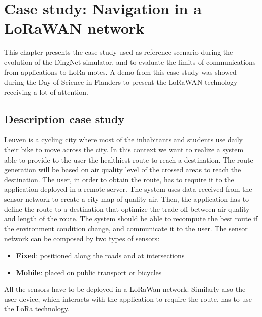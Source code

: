\chapter{Case study: Navigation in a LoRaWAN network}
\label{chap:case-staudyLoRa}

This chapter presents the case study used as reference scenario during the evolution of the DingNet simulator, and to evaluate the limits of communications from applications to LoRa motes. 
A demo from this case study was showed during the Day of Science in Flanders to present the LoRaWAN technology receiving a lot of attention.

\section{Description case study}
Leuven is a cycling city where most of the inhabitants and students use daily their bike to move across the city. 
In this context we want to realize a system able to provide to the user the healthiest route to reach a destination. 
The route generation will be based on air quality level of the crossed areas to reach the destination. 
The user, in order to obtain the route, has to require it to the application deployed in a remote server.
The system uses data received from the sensor network to create a city map of quality air.
Then, the application has to define the route to a destination that optimize the trade-off between air quality and length of the route.
The system should be able to recompute the best route if the environment condition change, and communicate it to the user.
The sensor network can be composed by two types of sensors:
\begin{itemize}
    \item \textbf{Fixed}: positioned along the roads and at intersections
    \item \textbf{Mobile}: placed on public transport or bicycles
\end{itemize}
All the sensors have to be deployed in a LoRaWan network.
Similarly also the user device, which interacts with the application to require the route, has to use the LoRa technology.

